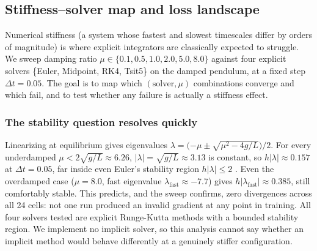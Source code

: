 \subsection{Stiffness--solver map and loss landscape}
\label{sec:track-d}

Numerical stiffness (a system whose fastest and slowest timescales differ by
orders of magnitude) is where explicit integrators are classically expected
to struggle. We sweep damping ratio
$\mu\in\{0.1,0.5,1.0,2.0,5.0,8.0\}$ against four explicit solvers \{Euler,
Midpoint, RK4, Tsit5\} \cite{tsitouras2011tsit5} on the damped pendulum, at a
fixed step $\Delta t=0.05$. The goal is to map which $(\text{solver},\mu)$
combinations converge and which fail, and to test whether any failure is
actually a stiffness effect.

\begin{expectbox}
\end{expectbox}

\subsubsection{The stability question resolves quickly}

Linearizing at equilibrium gives eigenvalues
$\lambda = \big({-\mu\pm\sqrt{\mu^2-4g/L}}\big)/2$. For every underdamped
$\mu<2\sqrt{g/L}\approx6.26$, $|\lambda|=\sqrt{g/L}\approx3.13$ is constant, so
$h|\lambda|\approx0.157$ at $\Delta t=0.05$, far inside even Euler's
stability region $h|\lambda|\le2$ \cite{dahlquist1963stability}. Even the
overdamped case ($\mu=8.0$, fast eigenvalue $\lambda_{\text{fast}}\approx-7.7$)
gives $h|\lambda_{\text{fast}}|\approx0.385$, still comfortably stable. This
predicts, and the sweep confirms, zero divergences across all 24 cells: not
one run produced an invalid gradient at any point in training. All four
solvers tested are explicit Runge-Kutta methods with a bounded stability
region. We implement no implicit solver, so this analysis cannot say whether
an implicit method would behave differently at a genuinely stiffer
configuration.

